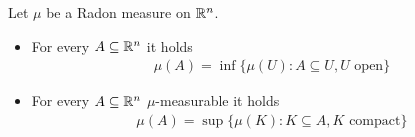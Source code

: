 \begin{thm}
  Let $\mu$ be a Radon measure on $\mathbb{R}^{n}$.
  \begin{itemize}
    \item For every $A \subseteq \mathbb{R}^{n}$ it holds
      \begin{align*}
        \mu(A) = \inf \{\mu(U): A \subseteq U, U \text{ open}\}
      \end{align*}
    \item For every $A \subseteq \mathbb{R}^{n}$ $\mu$-measurable it holds
      \begin{align*}
        \mu(A) = \sup \{\mu(K): K \subseteq A, K \text{ compact}\}
      \end{align*} 
  \end{itemize}
\end{thm}

